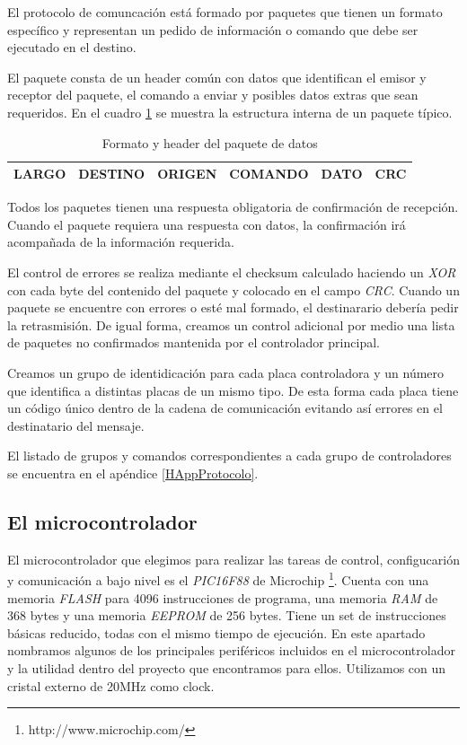 El protocolo de comuncaci\'on est\'a formado por paquetes que tienen un formato espec\'ifico y representan un pedido de informaci\'on o
comando que debe ser ejecutado en el destino. 

El paquete consta de un header com\'un con datos que identifican el emisor y receptor del paquete, el comando a enviar y posibles datos
extras que sean requeridos. En el cuadro \ref{Hformato_paquete_tabla} se muestra la estructura interna de un paquete t\'ipico.

\begin{table}[ht]
	\begin{center}
		\begin{tabular}{|c|c|c|c|c|c|}
			\hline
			LARGO & DESTINO & ORIGEN & COMANDO & DATO & CRC \\
			\hline
		\end{tabular}
	\caption{Formato y header del paquete de datos}
	\label{Hformato_paquete_tabla}
	\end{center}
\end{table}

Todos los paquetes tienen una respuesta obligatoria de confirmaci\'on de recepci\'on. Cuando el paquete requiera una respuesta
con datos, la confirmaci\'on ir\'a acompa\~nada de la informaci\'on requerida.

El control de errores se realiza mediante el checksum calculado haciendo un \emph{XOR} con cada byte del contenido del paquete
y colocado en el campo \emph{CRC}. Cuando un paquete se encuentre con errores o est\'e mal formado, el destinarario deber\'ia
pedir la retrasmisi\'on. De igual forma, creamos un control adicional por medio una lista de paquetes no confirmados mantenida
por el controlador principal.

Creamos un grupo de identidicaci\'on para cada placa controladora y un n\'umero que identifica a distintas placas de un mismo
tipo. De esta forma cada placa tiene un c\'odigo \'unico dentro de la cadena de comunicaci\'on evitando as\'i errores en el
destinatario del mensaje.

El listado de grupos y comandos correspondientes a cada grupo de controladores se encuentra en el ap\'endice \ref{HAppProtocolo}.

\subsection{El microcontrolador}
\label{Hmicro}

El microcontrolador que elegimos para realizar las tareas de control, configucari\'on y comunicaci\'on a bajo nivel es el \emph{PIC16F88} de
Microchip \footnote{http://www.microchip.com/}. Cuenta con una memoria \emph{FLASH} para 4096 instrucciones de programa, una memoria
\emph{RAM} de 368 bytes y una memoria \emph{EEPROM} de 256 bytes. Tiene un set de instrucciones b\'asicas reducido, todas con el mismo
tiempo de ejecuci\'on. En este apartado nombramos algunos de los principales perif\'ericos incluidos en el microcontrolador y la utilidad
dentro del proyecto que encontramos para ellos. Utilizamos con un cristal externo de 20MHz como clock.

